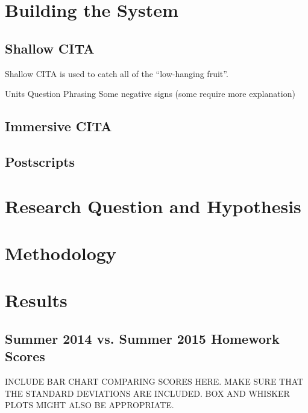 \section{Building the System}

\subsection{Shallow CITA}

Shallow CITA is used to catch all of the ``low-hanging fruit''.

Units
Question Phrasing
Some negative signs (some require more explanation)

\subsection{Immersive CITA}

\subsection{Postscripts}

\section{Research Question and Hypothesis}

\section{Methodology}

\section{Results}

\subsection{Summer 2014 vs. Summer 2015 Homework Scores}

INCLUDE BAR CHART COMPARING SCORES HERE. MAKE SURE THAT THE STANDARD DEVIATIONS ARE INCLUDED. BOX AND WHISKER PLOTS MIGHT ALSO BE APPROPRIATE.